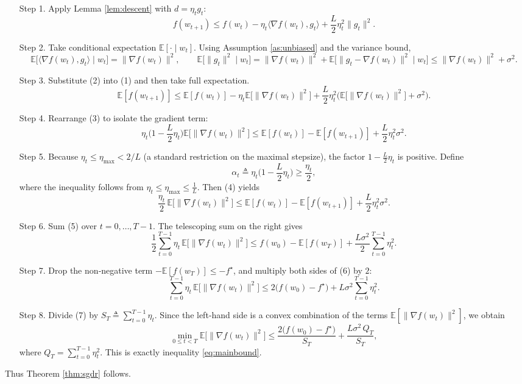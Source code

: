 \documentclass{article}
\begin{document}
\begin{enumerate}
\item[Step 1.] Apply Lemma \ref{lem:descent} with $d=\eta_t g_t$:
\[
f(w_{t+1})\le f(w_t)-\eta_t\langle\nabla f(w_t),g_t\rangle
+\frac{L}{2}\eta_t^{2}\|g_t\|^{2}.
\tag{1}
\]

\item[Step 2.] Take conditional expectation $\mathbb{E}[\cdot\mid w_t]$.
Using Assumption \ref{as:unbiased} and the variance bound,
\[
\mathbb{E}\!\big[\langle\nabla f(w_t),g_t\rangle\mid w_t\big]
= \|\nabla f(w_t)\|^{2},
\qquad
\mathbb{E}\!\big[\|g_t\|^{2}\mid w_t\big]
= \|\nabla f(w_t)\|^{2}+\mathbb{E}\!\big[\|g_t-\nabla f(w_t)\|^{2}\mid w_t\big]
\le \|\nabla f(w_t)\|^{2}+\sigma^{2}.
\tag{2}
\]

\item[Step 3.] Substitute (2) into (1) and then take full expectation.
\[
\mathbb{E}[f(w_{t+1})]\le
\mathbb{E}[f(w_t)]-\eta_t\mathbb{E}\!\big[\|\nabla f(w_t)\|^{2}\big]
+\frac{L}{2}\eta_t^{2}\Big(\mathbb{E}\!\big[\|\nabla f(w_t)\|^{2}\big]+\sigma^{2}\Big).
\tag{3}
\]

\item[Step 4.] Rearrange (3) to isolate the gradient term:
\[
\eta_t\Big(1-\frac{L}{2}\eta_t\Big)\mathbb{E}\!\big[\|\nabla f(w_t)\|^{2}\big]
\le
\mathbb{E}[f(w_t)]-\mathbb{E}[f(w_{t+1})]
+\frac{L}{2}\eta_t^{2}\sigma^{2}.
\tag{4}
\]

\item[Step 5.] Because $\eta_t\le\eta_{\max}<2/L$ (a standard
restriction on the maximal stepsize), the factor
$1-\frac{L}{2}\eta_t$ is positive.  Define
\[
\alpha_t\triangleq\eta_t\Big(1-\frac{L}{2}\eta_t\Big)\ge\frac{\eta_t}{2},
\]
where the inequality follows from $\eta_t\le\eta_{\max}\le\frac{1}{L}$.
Then (4) yields
\[
\frac{\eta_t}{2}\,\mathbb{E}\!\big[\|\nabla f(w_t)\|^{2}\big]
\le
\mathbb{E}[f(w_t)]-\mathbb{E}[f(w_{t+1})]
+\frac{L}{2}\eta_t^{2}\sigma^{2}.
\tag{5}
\]

\item[Step 6.] Sum (5) over $t=0,\dots,T-1$.
The telescoping sum on the right gives
\[
\frac{1}{2}\sum_{t=0}^{T-1}\eta_t\,
\mathbb{E}\!\big[\|\nabla f(w_t)\|^{2}\big]
\le
f(w_0)-\mathbb{E}[f(w_T)]
+\frac{L\sigma^{2}}{2}\sum_{t=0}^{T-1}\eta_t^{2}.
\tag{6}
\]

\item[Step 7.] Drop the non‑negative term $-\mathbb{E}[f(w_T)]\le -f^{\star}$,
and multiply both sides of (6) by $2$:
\[
\sum_{t=0}^{T-1}\eta_t\,
\mathbb{E}\!\big[\|\nabla f(w_t)\|^{2}\big]
\le
2\big(f(w_0)-f^{\star}\big)
+L\sigma^{2}\sum_{t=0}^{T-1}\eta_t^{2}.
\tag{7}
\]

\item[Step 8.] Divide (7) by $S_T\triangleq\sum_{t=0}^{T-1}\eta_t$.
Since the left‑hand side is a convex combination of the terms
$\mathbb{E}[\|\nabla f(w_t)\|^{2}]$, we obtain
\[
\min_{0\le t<T}\mathbb{E}\!\big[\|\nabla f(w_t)\|^{2}\big]
\le
\frac{2\big(f(w_0)-f^{\star}\big)}{S_T}
+\frac{L\sigma^{2}\,Q_T}{S_T},
\tag{8}
\]
where $Q_T=\sum_{t=0}^{T-1}\eta_t^{2}$.  This is exactly inequality \eqref{eq:mainbound}.
\end{enumerate}
Thus Theorem \ref{thm:sgdr} follows.
\end{document}
